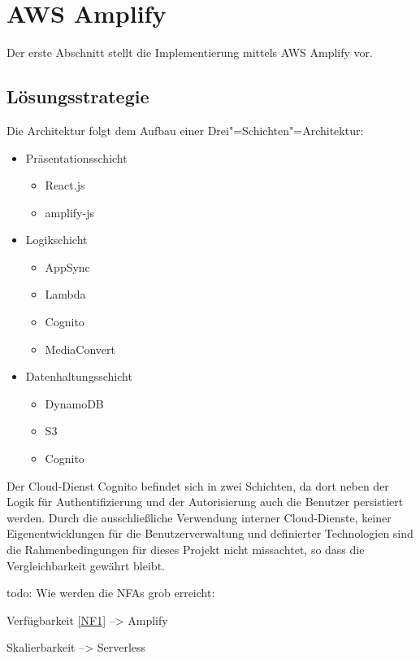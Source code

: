 \section{AWS Amplify}

Der erste Abschnitt stellt die Implementierung mittels \ac{AWS} Amplify vor.

\subsection{Lösungsstrategie}

Die Architektur folgt dem Aufbau einer Drei"=Schichten"=Architektur:

\begin{itemize}
  \item Präsentationsschicht
    \begin{itemize}
      \item React.js
      \item amplify-js
    \end{itemize}
  \item Logikschicht
    \begin{itemize}
      \item AppSync
      \item Lambda
      \item Cognito
      \item MediaConvert
    \end{itemize}
  \item Datenhaltungsschicht
    \begin{itemize}
      \item DynamoDB
      \item S3
      \item Cognito
    \end{itemize}
\end{itemize}

Der Cloud-Dienst Cognito befindet sich in zwei Schichten, da dort neben der Logik für Authentifizierung und der Autorisierung auch die Benutzer persistiert werden. Durch die ausschließliche Verwendung interner Cloud-Dienste, keiner Eigenentwicklungen für die Benutzerverwaltung und definierter Technologien sind die Rahmenbedingungen für dieses Projekt nicht missachtet, so dass die Vergleichbarkeit gewährt bleibt.

todo: Wie werden die NFAs grob erreicht:

Verfügbarkeit \autoref{NF1}
--> Amplify

Skalierbarkeit
--> Serverless

